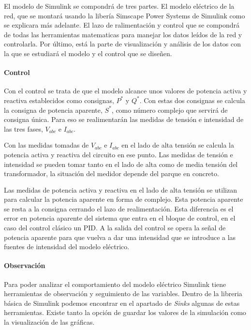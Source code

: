 \documentclass{book}
\begin{document}
El modelo de Simulink se compondr\'a de tres partes. El modelo el\'ectrico de la red, que se montar\'a usando la liber\'ia Simscape Power Systems de Simulink como se explicara m\'as adelante. El lazo de ralimentaci\'on y control que se compondr\'a de todas las herramientas matematicas para manejar los datos le\'idos de la red y controlarla. Por \'ultimo, est\'a la parte de visualizaci\'on y an\'alisis de los datos con la que se estudiar\'a el modelo y el control que se diseñen.   \par

		\paragraph{Control} 
Con el control se trata de que el modelo alcance unos valores de potencia activa y reactiva establecidos como consignas, $P^*$ y $Q^*$. Con estas dos consignas se calcula la consigna de potencia aparente, $S^*$, como n\'umero complejo que servir\'a de consigna \'unica. Para eso se realimentar\'an las medidas de tensi\'on e intensidad de las tres fases, $V_{abc}$ e $I_{abc}$. \par

Con las medidas tomadas de $V_{abc}$ e $I_{abc}$ en el lado de alta tensi\'on se calcula la potencia activa y reactiva del circuito en ese punto. Las medidas de tensi\'on e intensidad se pueden tomar tanto en el lado de alta como de media tensi\'on del transformador, la situaci\'on del medidor depende del parque en concreto. \par

Las medidas de potencia activa y reactiva en el lado de alta tensi\'on se utilizan para calcular la potencia aparente en forma de complejo. Esta potencia aparente se resta a la consigna cerrando el lazo de realimentaci\'on. Esta diferencia es el error en potencia aparente del sistema que entra en el bloque de control, en el caso del control cl\'asico un PID. A la salida del control se opera la señal de potencia aparente para que vuelva a dar una intensidad que se introduce a las fuentes de intensidad del modelo el\'ectrico.  \par

		\paragraph{Observaci\'on}
Para poder analizar el comportamiento del modelo el\'ectrico Simulink tiene herramientas de observación y seguimiento de las variables. Dentro de la libreria b\'asica de Simulink podemos encontrar en el apartado de \emph{Sinks} algunas de estas herramientas. Existe tanto la opci\'on de guardar los valores de la simulaci\'on como la visualizaci\'on de las gr\'aficas. \par
\end{document}
